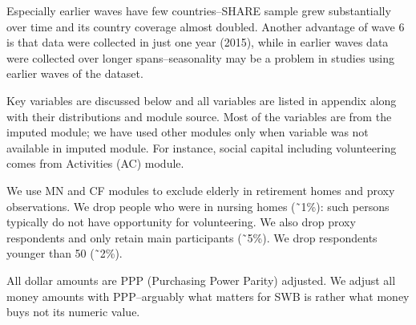 \documentclass[10pt, letterpaper]{article}
\begin{document}
\begin{spacing}{1.4}
                                
Especially earlier waves have few countries--SHARE sample grew substantially
over time and its country coverage almost doubled. Another advantage of wave 6 is that
data were collected in just one year (2015), %
while in earlier waves data were collected over longer spans--seasonality may be
a problem in studies using earlier waves of the dataset.

Key variables are discussed below and all variables are listed in appendix along
with their distributions and module source.
Most of the variables are from the imputed module; we have used other modules
only when variable was not available in imputed module. For instance, social capital including
volunteering comes from Activities (AC) module. 

 We use MN and CF modules to
exclude elderly in retirement homes and proxy observations.
%
We drop people who were in nursing homes (\~\ 1\%): such persons typically do
not have opportunity for volunteering. We also drop proxy respondents and only retain
main participants (\~\ 5\%). %
 We drop respondents younger than 50 (\~\ 2\%). %


All dollar amounts are PPP (Purchasing Power Parity) adjusted. We adjust all money amounts with
PPP--arguably what matters for SWB is rather what money buys not its numeric value.


\end{spacing}
\end{document}
